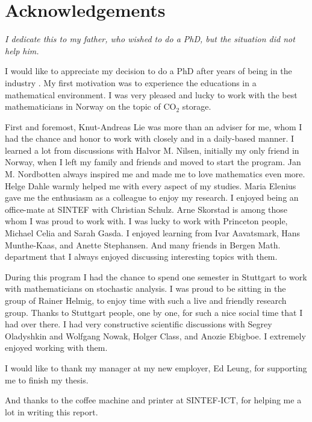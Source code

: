 \chapter{Acknowledgements}

\textit{\small{I dedicate this to my father, who wished to do a PhD, but the
situation did not help him.}} 

\vspace{1cm}
I would like to appreciate my decision to do a PhD after years of being in the
industry . My first motivation was to
experience the educations in a mathematical environment. I was very pleased and
lucky to work with the best mathematicians in Norway
on the topic of CO$_2$ storage.

First and foremost, Knut-Andreas Lie was more than an adviser for me, whom I had
the chance and honor to work with closely and in a daily-based manner. I learned
a lot from discussions with Halvor M. Nilsen, initially my only friend in
Norway,
when I left my family and friends and moved to start the program. Jan
M. Nordbotten always inspired me and made me to love mathematics even more.
Helge Dahle warmly helped me with every aspect of my studies. Maria Elenius gave
me the enthusiasm as a colleague to enjoy my research. I enjoyed being an
office-mate at SINTEF with Christian Schulz. Arne Skorstad is among those whom
I was proud to work with. I was lucky to work with Princeton people, Michael
Celia and Sarah Gasda. I enjoyed learning from Ivar Aavatsmark, Hans
Munthe-Kaas, and Anette Stephansen. And many friends in Bergen Math.
department that I always enjoyed discussing interesting topics with them.

During this program I had the chance to spend one semester in Stuttgart to
work with mathematicians on stochastic analysis. I was proud to be sitting in
the group of Rainer Helmig, to enjoy time with such a live and friendly
research group. Thanks to Stuttgart people, one by one, for such a nice social
time that I had over there. I had very constructive scientific discussions with
Segrey
Oladyshkin and Wolfgang Nowak, Holger Class, and Anozie Ebigboe. I extremely
enjoyed working with them.

I would like to thank my manager at my new employer, Ed Leung, for supporting
me to finish my thesis.

And thanks to the coffee machine and printer at SINTEF-ICT, for helping me a lot
in writing this report.











